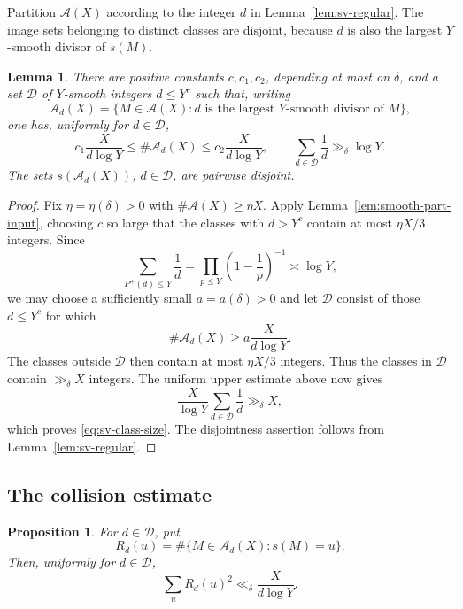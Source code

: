 \documentclass[11pt]{article}
\newtheorem{lemma}[theorem]{Lemma}
\newtheorem{proposition}[theorem]{Proposition}
\theoremstyle{remark}
\newcommand{\1}{\mathbf 1}
\begin{document}
Partition $\mathcal A(X)$ according to the integer $d$ in
Lemma~\ref{lem:sv-regular}.  The image sets belonging to distinct classes
are disjoint, because $d$ is also the largest $Y$-smooth divisor of $s(M)$.

\begin{lemma}\label{lem:sv-classes}
There are positive constants $c,c_1,c_2$, depending at most on $\delta$, and a set $\mathcal D$ of $Y$-smooth
integers $d\leq Y^c$ such that, writing
\[
  \mathcal A_d(X)=\{M\in\mathcal A(X):d
  \text{ is the largest $Y$-smooth divisor of }M\},
\]
one has, uniformly for $d\in\mathcal D$,
\begin{equation}\label{eq:sv-class-size}
  c_1\frac{X}{d\log Y}
  \leq\#\mathcal A_d(X)
  \leq c_2\frac{X}{d\log Y},
  \qquad
  \sum_{d\in\mathcal D}\frac1d\gg_\delta\log Y.
\end{equation}
The sets $s(\mathcal A_d(X))$, $d\in\mathcal D$, are pairwise disjoint.
\end{lemma}

\begin{proof}
Fix $\eta=\eta(\delta)>0$ with $\#\mathcal A(X)\geq\eta X$.
Apply Lemma~\ref{lem:smooth-part-input}, choosing $c$ so large that the
classes with $d>Y^c$ contain at most $\eta X/3$ integers.  Since
\[
  \sum_{P^+(d)\leq Y}\frac1d
  =\prod_{p\leq Y}\left(1-\frac1p\right)^{-1}
  \asymp\log Y,
\]
we may choose a sufficiently small $a=a(\delta)>0$ and let $\mathcal D$
consist of those $d\leq Y^c$ for which
\[
  \#\mathcal A_d(X)\geq a\frac{X}{d\log Y}.
\]
The classes outside $\mathcal D$ then contain at most $\eta X/3$ integers.
Thus the classes in $\mathcal D$ contain $\gg_\delta X$ integers.  The
uniform upper estimate above now gives
\[
  \frac{X}{\log Y}\sum_{d\in\mathcal D}\frac1d
  \gg_\delta X,
\]
which proves \eqref{eq:sv-class-size}.  The disjointness assertion follows
from Lemma~\ref{lem:sv-regular}.
\end{proof}

\subsection{The collision estimate}

\begin{proposition}\label{prop:sv-second-moment}
For $d\in\mathcal D$, put
\[
  R_d(u)=\#\{M\in\mathcal A_d(X):s(M)=u\}.
\]
Then, uniformly for $d\in\mathcal D$,
\begin{equation}\label{eq:sv-second-moment}
  \sum_uR_d(u)^2\ll_\delta\frac{X}{d\log Y}.
\end{equation}
\end{proposition}
\end{document}
